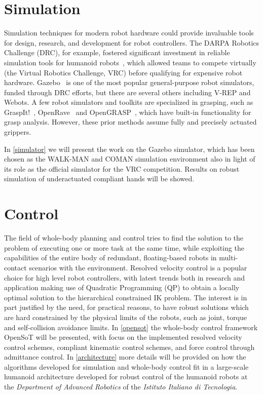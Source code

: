 \documentclass[%
	paper=A4,					%
	twoside=true,				%
	openright,			.
	parskip=full,				%
	chapterprefix=true,			%
	11pt,						%
	headings=normal,			%
	bibliography=totoc,			%
	listof=totoc,				%
	titlepage=on,				%
	captions=tableabove,		%
	draft=true,				%
]{scrreprt}%
\begin{document}
\section{Simulation}
Simulation techniques for modern robot hardware could provide invaluable tools for design, research, and development for robot controllers.  The DARPA Robotics Challenge (DRC), for example, fostered significant investment in reliable simulation tools for humanoid robots~\cite{Hsu14}, which allowed teams to compete virtually (the Virtual Robotics Challenge, VRC) before qualifying for expensive robot hardware.  Gazebo~\cite{Koenig08} is one of the most popular general-purpose robot simulators, funded through DRC efforts, but there are several others including V-REP and Webots.  A few robot simulators and toolkits are specialized in grasping, such as GraspIt!~\cite{Miller04}, OpenRave~\cite{Diankov08OpenRAVE} and OpenGRASP~\cite{Leon10OpenGRASP}, which have built-in functionality for grasp analysis. However, these prior methods assume fully and precisely actuated grippers. 

In \ref{simulator} we will present the work on the Gazebo simulator, which has been chosen as the WALK-MAN and COMAN simulation environment also in light of its role as the official simulator for the VRC competition. Results on robust simulation of underactuated compliant hands will be showed.

\section{Control}
The field of whole-body planning and control tries to find the solution to the problem of executing one or more task at the same time, while exploiting the capabilities of the entire body of redundant, floating-based robots in multi-contact scenarios with the environment.
Resolved velocity control is a popular choice for high level robot controllers, with latest trends both in research and application making use of Quadratic Programming (QP) to obtain a locally optimal solution to the hierarchical constrained IK problem. The interest is in part justified by the need, for practical reasons, to have robust solutions which are hard constrained by the physical limits of the robots, such as joint, torque and self-collision avoidance limits.
In \ref{opensot} the whole-body control framework OpenSoT will be presented, with focus on the implemented resolved velocity control schemes, compliant kinematic control schemes, and force control through admittance control. In \ref{architecture} more details will be provided on how the algorithms developed for simulation and whole-body control fit in a large-scale humanoid architecture developed for robust control of the humanoid robots at the \emph{Department of Advanced Robotics} of the \emph{Istituto Italiano di Tecnologia}.
\end{document}
